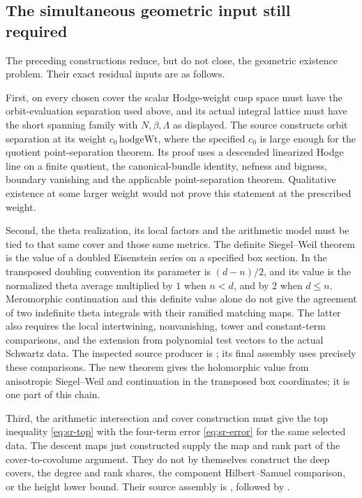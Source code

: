 \subsection{The simultaneous geometric input still required}
\label{sec:sr-geometric-selection-residual}

The preceding constructions reduce, but do not close, the geometric
existence problem.  Their exact residual inputs are as follows.

First, on every chosen cover the scalar Hodge-weight cusp space must
have the orbit-evaluation separation used above, and its actual
integral lattice must have the short spanning family with
\(N,\beta,\Lambda\) as displayed.
The source constructs orbit separation at its weight
\(c_0\,\mathrm{hodgeWt}\), where the specified \(c_0\) is large enough
for the quotient point-separation theorem.
Its proof uses a descended linearized Hodge line on a finite quotient,
the canonical-bundle identity, nefness and bigness, boundary vanishing
and the applicable point-separation theorem.
Qualitative existence at some larger weight would not prove this
statement at the prescribed weight.

Second, the theta realization, its local factors and the arithmetic
model must be tied to that same cover and those same metrics.
The definite Siegel--Weil theorem is the value of a doubled
Eisenstein series on a specified box section.
In the transposed doubling convention its parameter is
\((d-n)/2\), and its value is the normalized theta average multiplied
by \(1\) when \(n<d\), and by \(2\) when \(d\leq n\).
Meromorphic continuation and this definite value alone do not give
the agreement of two indefinite theta integrals with their ramified
matching maps.
The latter also requires the local intertwining, nonvanishing,
tower and constant-term comparisons, and the extension from
polynomial test vectors to the actual Schwartz data.
The inspected source producer is
; its final assembly
 uses precisely these
comparisons.  The new  theorem gives the
holomorphic value from anisotropic Siegel--Weil and continuation
in the transposed box coordinates; it is one part of this chain.

Third, the arithmetic intersection and cover construction must give
the top inequality \eqref{eq:sr-top} with the four-term error
\eqref{eq:sr-error} for the same selected data.
The descent maps just constructed supply the map and rank part of
the cover-to-covolume argument.  They do not by themselves construct
the deep covers, the degree and rank shares, the component
Hilbert--Samuel comparison, or the height lower bound.
Their source assembly is
, followed by
.

